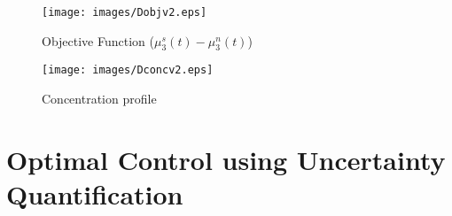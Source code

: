 \documentclass[3p,times,authoryear]{elsarticle}
\begin{document}
\begin{figure}[h!] 
\begin{center} 
\texttt{[image: images/Dobjv2.eps]}
\end{center}
\caption{Objective Function ($\mu_{3}^{s}(t) - \mu_{3}^{n}(t)$)} \label{Dobj}
\end{figure}

\begin{figure}[h!] 

\begin{center} 
\texttt{[image: images/Dconcv2.eps]}
\end{center}
\caption{Concentration profile} \label{Dconc}
\end{figure}

\section{Optimal Control using Uncertainty Quantification}
\end{document}
